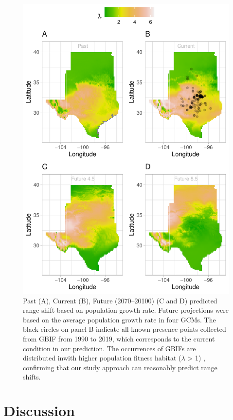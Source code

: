 \documentclass[12pt]{article}
\begin{document}
\begin{figure}%
  \begin{center}
    \includegraphics[width=0.78\linewidth]{Figures/Fig_geoprojection.pdf}
  \caption{Past (A), Current (B), Future (2070–20100) (C and D) predicted range shift based on population growth rate. Future projections were based on the average population growth rate in four GCMs. The black circles on panel B indicate all known presence points collected from GBIF from 1990 to 2019, which corresponds to the current condition in our prediction.  The occurrences of GBIFs are distributed inwith higher population fitness habitat ($\lambda$ > 1) , confirming that our study approach can reasonably predict range shifts. }
  \label{fig:geoproj}
  \end{center}
\end{figure}

\section*{Discussion}




\newpage


\newpage
\clearpage 
\setcounter{equation}{0}
\setcounter{figure}{0}
\setcounter{section}{0}
\setcounter{table}{0}
\renewcommand{\theequation}{S.\arabic{equation}}
\renewcommand{\thetable}{S-\arabic{table}}
\renewcommand{\thefigure}{S-\arabic{figure}}
\renewcommand{\thesection}{S.\arabic{section}}
\end{document}
